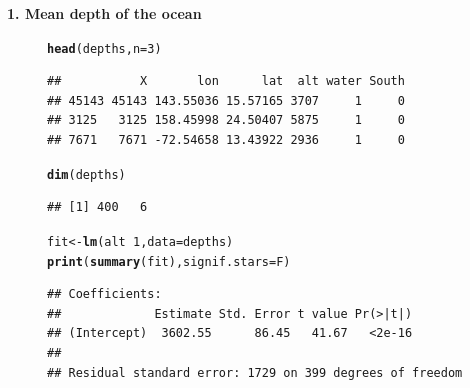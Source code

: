 \documentclass[10pt,handout]{beamer}\usepackage[]{graphicx}\usepackage[]{color}
\makeatletter
\newcommand{\hlnum}[1]{\textcolor[rgb]{0.686,0.059,0.569}{#1}}%
\newcommand{\hlopt}[1]{\textcolor[rgb]{0,0,0}{#1}}%
\newcommand{\hlstd}[1]{\textcolor[rgb]{0.345,0.345,0.345}{#1}}%
\newcommand{\hlkwb}[1]{\textcolor[rgb]{0.69,0.353,0.396}{#1}}%
\newcommand{\hlkwc}[1]{\textcolor[rgb]{0.333,0.667,0.333}{#1}}%
\newcommand{\hlkwd}[1]{\textcolor[rgb]{0.737,0.353,0.396}{\textbf{#1}}}%
\newenvironment{kframe}{%
 \def\at@end@of@kframe{}%
 \ifinner\ifhmode%
  \def\at@end@of@kframe{\end{minipage}}%
  \begin{minipage}{\columnwidth}%
 \fi\fi%
 \def\FrameCommand##1{\hskip\@totalleftmargin \hskip-\fboxsep
 \colorbox{shadecolor}{##1}\hskip-\fboxsep
     \hskip-\linewidth \hskip-\@totalleftmargin \hskip\columnwidth}%
 \MakeFramed {\advance\hsize-\width
   \@totalleftmargin\z@ \linewidth\hsize
   \@setminipage}}%
 {\par\unskip\endMakeFramed%
 \at@end@of@kframe}
\newenvironment{knitrout}{}{} %
\makeatother
\begin{document}
\begin{frame}
\vspace*{-1.50in}
\textbf{1. Mean depth of the ocean}



\begin{figure}
	\begin{minipage}[h]{0.40\linewidth}
\begin{knitrout}\tiny
{}\color{fgcolor}\begin{kframe}
\begin{alltt}
\hlkwd{head}\hlstd{(depths,} \hlkwc{n}\hlstd{=}\hlnum{3}\hlstd{)}
\end{alltt}
\begin{verbatim}
##           X       lon      lat  alt water South
## 45143 45143 143.55036 15.57165 3707     1     0
## 3125   3125 158.45998 24.50407 5875     1     0
## 7671   7671 -72.54658 13.43922 2936     1     0
\end{verbatim}
\begin{alltt}
\hlkwd{dim}\hlstd{(depths)}
\end{alltt}
\begin{verbatim}
## [1] 400   6
\end{verbatim}
\end{kframe}
\end{knitrout}
		
	\end{minipage}
	\hspace{0.4cm}
	\begin{minipage}[h]{0.50\linewidth}
\begin{knitrout}\tiny
{}\color{fgcolor}\begin{kframe}
\begin{alltt}
\hlstd{fit} \hlkwb{<-} \hlkwd{lm}\hlstd{(alt} \hlopt{~} \hlnum{1}\hlstd{,} \hlkwc{data} \hlstd{= depths)}
\hlkwd{print}\hlstd{(}\hlkwd{summary}\hlstd{(fit),} \hlkwc{signif.stars} \hlstd{= F)}
\end{alltt}
\begin{verbatim}
## Coefficients:
##             Estimate Std. Error t value Pr(>|t|)
## (Intercept)  3602.55      86.45   41.67   <2e-16
## 
## Residual standard error: 1729 on 399 degrees of freedom
\end{verbatim}
\end{kframe}
\end{knitrout}
	\end{minipage}
\end{figure}



\end{frame}
\end{document}
